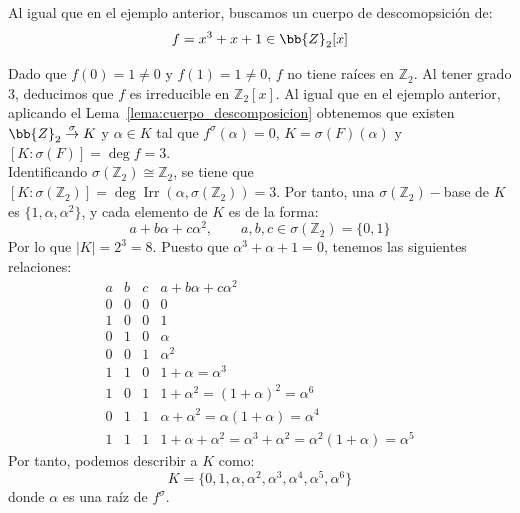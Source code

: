 \begin{ejemplo}
    Al igual que en el ejemplo anterior, buscamos un cuerpo de descomopsición de:
    \begin{equation*}
        f = x^3+x+1 \in \bb{Z}_2[x]
    \end{equation*}

    Dado que $f(0) = 1 \neq 0$ y $f(1) = 1 \neq 0$, $f$ no tiene raíces en $\mathbb{Z}_2$. Al tener grado 3, deducimos que $f$ es irreducible en $\mathbb{Z}_2[x]$. Al igual que en el ejemplo anterior, aplicando el Lema~\ref{lema:cuerpo_descomposicion} obtenemos que existen $\bb{Z}_2\stackrel{\sigma}{\to}K$ y $\alpha\in K$ tal que $f^\sigma(\alpha) = 0$, $K = \sigma(F)(\alpha)$ y $[K:\sigma(F)] = \deg f = 3$.\\

    Identificando $\sigma(\mathbb{Z}_2) \cong \mathbb{Z}_2$, se tiene que $[K : \sigma(\mathbb{Z}_2)] = \deg \operatorname{Irr}(\alpha, \sigma(\mathbb{Z}_2)) = 3$. Por tanto, una $\sigma(\mathbb{Z}_2)-$base de $K$ es $\{1,\alpha,\alpha^2\}$, y cada elemento de $K$ es de la forma:
    \begin{equation*}
        a + b\alpha + c\alpha^2, \qquad a,b,c\in \sigma(\mathbb{Z}_2) = \{0,1\}
    \end{equation*}
    Por lo que $|K| = 2^3 = 8$. Puesto que $\alpha^3 + \alpha + 1 = 0$, tenemos las siguientes relaciones:
    \begin{equation*}
        \begin{array}{ccc|l}
            a & b & c & a + b\alpha + c\alpha^2 \\
            \hline
            0 & 0 & 0 & 0 \\
            1 & 0 & 0 & 1 \\
            0 & 1 & 0 & \alpha \\
            0 & 0 & 1 & \alpha^2 \\
            1 & 1 & 0 & 1 + \alpha = \alpha^3 \\
            1 & 0 & 1 & 1 + \alpha^2 =(1+\alpha)^2 = \alpha^6 \\
            0 & 1 & 1 & \alpha + \alpha^2 = \alpha(1+\alpha) = \alpha^4 \\
            1 & 1 & 1 & 1 + \alpha + \alpha^2 = \alpha^3 + \alpha^2 = \alpha^2(1+\alpha) = \alpha^5
        \end{array}
    \end{equation*}
    Por tanto, podemos describir a $K$ como:
    \begin{equation*}
        K = \{0,1,\alpha,\alpha^2,\alpha^3,\alpha^4,\alpha^5,\alpha^6\}
    \end{equation*}
    donde $\alpha$ es una raíz de $f^\sigma$.\\


\end{ejemplo}
